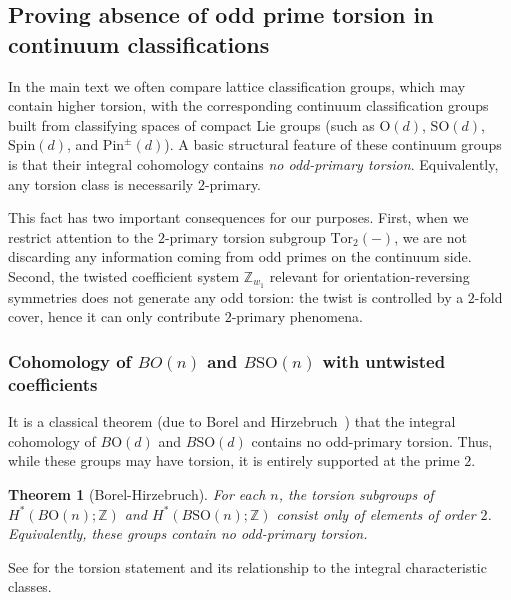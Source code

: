 \documentclass[aps,prx,reprint,superscriptaddress,twocolumn,amsmath,amssymb,amsfonts, nofootinbib]{revtex4-2}
\newcommand{\SO}{\text{SO}}
\newcommand{\tor}{\text{Tor}}
\newcommand{\Z}{\mathbb{Z}}
\theoremstyle{apsstyle}
\newtheorem{theorem}{Theorem}[section]
\begin{document}
\subsection{Proving absence of odd prime torsion in continuum classifications}
\label{app:no_odd_torsion}

In the main text we often compare lattice classification groups, which may contain higher torsion, with the corresponding continuum classification groups built from classifying spaces of compact Lie groups (such as $\mathrm{O}(d)$, $\SO(d)$, $\mathrm{Spin}(d)$, and $\mathrm{Pin}^{\pm}(d)$). A basic structural feature of these continuum groups is that their integral cohomology contains \emph{no odd-primary torsion}. Equivalently, any torsion class is necessarily $2$-primary.

\bigskip

This fact has two important consequences for our purposes. First, when we restrict attention to the $2$-primary torsion subgroup $\tor_{2}(-)$, we are not discarding any information coming from odd primes on the continuum side. Second, the twisted coefficient system $\Z_{w_{1}}$ relevant for
orientation-reversing symmetries does not generate any odd torsion: the twist is controlled by a $2$-fold cover, hence it can only contribute $2$-primary phenomena.


\subsubsection{Cohomology of $BO(n)$ and $B\SO(n)$ with untwisted coefficients}

It is a classical theorem (due to Borel and Hirzebruch~\cite{BorelHirzebruchII}) that the integral cohomology of $B\mathrm{O}(d)$ and $B\SO(d)$ contains no odd-primary torsion. Thus, while these groups may have torsion, it is entirely supported at the prime $2$.

\bigskip 

\begin{theorem}[Borel-Hirzebruch]
\label{thm:BH_no_odd_torsion}
For each $n$, the torsion subgroups of $H^{*}(B\mathrm{O}(n);\Z)$ and $H^{*}(B\SO(n);\Z)$ consist only of elements of order $2$. Equivalently, these groups contain no odd-primary torsion.
\end{theorem}

\bigskip 

\noindent See \cite[\S30.5, Proposition]{BorelHirzebruchII} for the torsion statement and its relationship to the integral characteristic classes.
\end{document}

